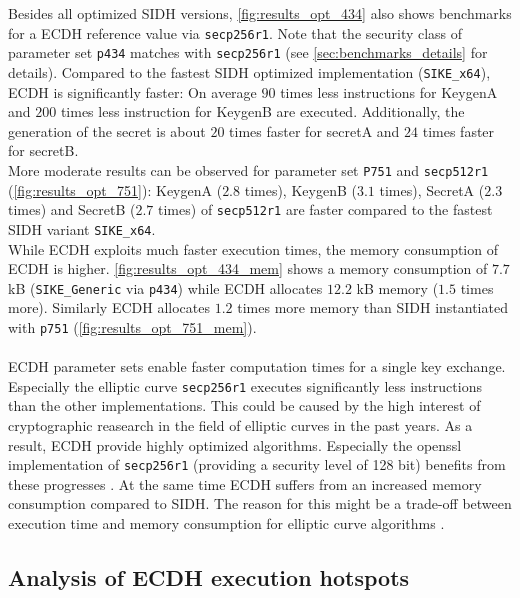 Besides all optimized \gls{SIDH} versions, \autoref{fig:results_opt_434} also shows benchmarks for a \gls{ECDH} reference value via \texttt{secp256r1}. Note that the security class of parameter set \texttt{p434} matches with \texttt{secp256r1} (see \autoref{sec:benchmarks_details} for details). Compared to the fastest \gls{SIDH} optimized implementation (\texttt{SIKE\_x64}), \gls{ECDH} is significantly faster: On average $90$ times less instructions for KeygenA and $200$ times less instruction for KeygenB are executed. Additionally, the generation of the secret is about $20$ times faster for secretA and $24$ times faster for secretB.\\
More moderate results can be observed for parameter set \texttt{P751} and \texttt{secp512r1} (\autoref{fig:results_opt_751}): KeygenA ($2.8$ times),  KeygenB ($3.1$ times), SecretA ($2.3$ times) and SecretB ($2.7$ times) of \texttt{secp512r1} are faster compared to the fastest \gls{SIDH} variant \texttt{SIKE\_x64}.
\\
While \gls{ECDH} exploits much faster execution times, the memory consumption of \gls{ECDH} is higher.  \autoref{fig:results_opt_434_mem} shows a memory consumption of $7.7$ \gls{kB} (\texttt{SIKE\_Generic} via \texttt{p434}) while \gls{ECDH} allocates $12.2$ \gls{kB} memory ($1.5$ times more). Similarly \gls{ECDH} allocates $1.2$ times more memory than \gls{SIDH} instantiated with \texttt{p751} (\autoref{fig:results_opt_751_mem}).
\\\\
\gls{ECDH} parameter sets enable faster computation times for a single key exchange.
Especially the elliptic curve \texttt{secp256r1} executes significantly less instructions than the other implementations. This could be caused by the high interest of cryptographic reasearch in the field of elliptic curves in the past years. As a result, \gls{ECDH} provide highly optimized algorithms. Especially the \gls{openssl} implementation of \texttt{secp256r1} (providing a security level of 128 bit) benefits from these progresses \parencite{adalier2015efficient}. At the same time \gls{ECDH} suffers from an increased memory consumption compared to \gls{SIDH}. The reason for this might be a trade-off between execution time and memory consumption for elliptic curve algorithms \parencite{adalier2015efficient}.

\subsection{Analysis of \gls{ECDH} execution hotspots}
\label{sec:analysis_ecdh_hotspots}

